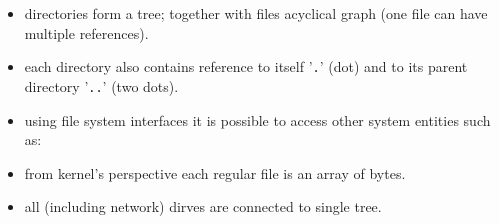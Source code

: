 
\begin{slide}
\setlength{\baselineskip}{0.8\baselineskip}
\begin{itemize}
\item directories form a tree; together with files acyclical graph
(one file can have multiple references).
\item each directory also contains reference to itself '\texttt{.}'
(dot) and to its parent directory '\texttt{..}' (two dots). 
\item using file system interfaces it is possible to access other system
entities such as:
\item from kernel's perspective each regular file is an array of bytes.
\item all (including network) dirves are connected to single tree.
\end{itemize}
\end{slide}

\label{DEVFS}

